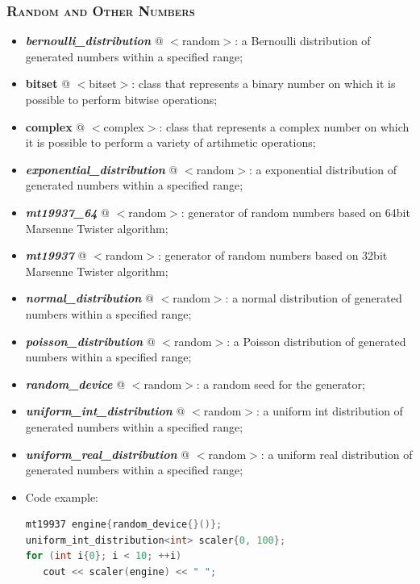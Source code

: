 \documentclass[10pt]{article}
\begin{document}
\begin{multicols*}{4}
{{\subsubsection*{\textsc{Random and Other Numbers}} 
\begin{itemize}[leftmargin=*,topsep=0.25pt]
  \setlength\itemsep{-1.8pt}
\item  \emph{\textbf{bernoulli\_distribution}} @ $<$random$>$: a Bernoulli distribution of generated numbers within a specified range; 
\item  \textbf{bitset} @ $<$bitset$>$: class that represents a binary number on which  it is possible to perform bitwise operations;
\item  \textbf{complex} @ $<$complex$>$: class that represents a complex number on which  it is possible to perform a variety of artihmetic operations;
\item  \emph{\textbf{exponential\_distribution}} @ $<$random$>$: a exponential distribution of generated numbers within a specified range; 
\item  \emph{\textbf{mt19937\_64}} @ $<$random$>$: generator of random numbers based on 64bit Marsenne Twister algorithm;  
\item  \emph{\textbf{mt19937}} @ $<$random$>$: generator of random numbers based on 32bit Marsenne Twister algorithm;  
\item  \emph{\textbf{normal\_distribution}} @ $<$random$>$: a normal distribution of generated numbers within a specified range; 
\item  \emph{\textbf{poisson\_distribution}} @ $<$random$>$: a Poisson distribution of generated numbers within a specified range; 
\item  \emph{\textbf{random\_device}} @ $<$random$>$: a random seed for the generator; 
\item  \emph{\textbf{uniform\_int\_distribution}} @ $<$random$>$: a uniform int distribution of generated numbers within a specified range; 
\item  \emph{\textbf{uniform\_real\_distribution}} @ $<$random$>$: a uniform real distribution of generated numbers within a specified range;
\item Code example:
{\selectfont \lstset{style=mystyle}
 \begin{lstlisting}[language=C++]
mt19937 engine{random_device{}()};
uniform_int_distribution<int> scaler{0, 100};
for (int i{0}; i < 10; ++i) 
   cout << scaler(engine) << " ";
\end{lstlisting}
 }


\end{itemize}}}
\end{multicols*}
\end{document}
